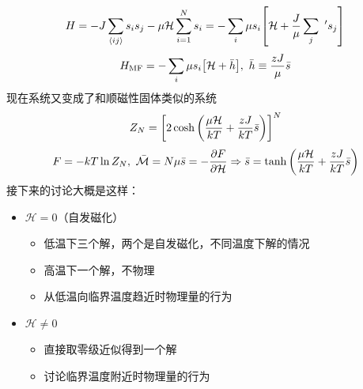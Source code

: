 \[
    H = - J \sum_{\expval{i j}}s_i s_j - \mu \mathcal{H} \sum_{i = 1}^N s_i = - \sum_i \mu s_i \qty[\mathcal{H} + \frac{J}{\mu} \sum_j \ ' s_j]
\] \[
    H_{\text{MF}} = - \sum_i \mu s_i \qty[\mathcal{H} + \bar{h}],\ \bar{h} \equiv \frac{z J}{\mu} \bar{s}
\] 现在系统又变成了和顺磁性固体类似的系统 \[
    Z_N = \qty[2 \cosh \qty(\frac{\mu \mathcal{H}}{k T} + \frac{z J}{k T} \bar{s})]^N
\] \[
    F = - k T \ln{Z_N},\ \bar{\mathcal{M}} = N \mu \bar{s} = - \pdv{F}{\mathcal{H}} \Rightarrow \bar{s} = \tanh \qty(\frac{\mu \mathcal{H}}{k T} + \frac{z J}{k T} \bar{s})
\] 接下来的讨论大概是这样：\begin{itemize}
    \item $\mathcal{H} = 0$（自发磁化） \begin{itemize}
              \item 低温下三个解，两个是自发磁化，不同温度下解的情况
              \item 高温下一个解，不物理
              \item 从低温向临界温度趋近时物理量的行为
          \end{itemize}
    \item $\mathcal{H} \neq 0$ \begin{itemize}
              \item 直接取零级近似得到一个解
              \item 讨论临界温度附近时物理量的行为
          \end{itemize}
\end{itemize}